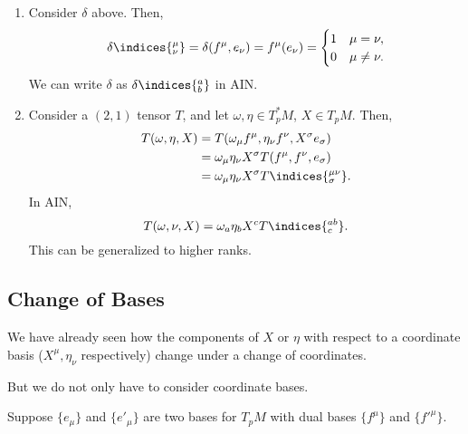 \documentclass[12pt]{article}
\begin{document}
\begin{exbox}
	\begin{enumerate}
		\item Consider $\delta$ above. Then,
			\[
			\delta\indices{^{\mu}_{\nu}} = \delta(f^\mu, e_\nu) = f^\mu(e_\nu) =
			\begin{cases}
				1 & \mu = \nu,\\
				0 & \mu \neq \nu.
			\end{cases}
			\]
			We can write $\delta$ as $\delta\indices{^{a}_{b}}$ in AIN.
		\item Consider a $(2, 1)$ tensor $T$, and let $\omega, \eta \in T_p^\ast M$, $X \in T_p M$. Then,
			\begin{align*}
				T(\omega, \eta, X) &= T(\omega_\mu f^\mu, \eta_\nu f^\nu, X^\sigma e_\sigma) \\
						   &= \omega_\mu \eta_\nu X^\sigma T(f^\mu, f^\nu, e_\sigma) \\
						   &= \omega_\mu \eta_\nu X^\sigma T\indices{^{\mu\nu}_{\sigma}}.
			\end{align*}
			In AIN,
			\[
			T(\omega, \nu, X) = \omega_a \eta_b X^c T\indices{^{ab}_{c}}.
			\]
			This can be generalized to higher ranks.
	\end{enumerate}
	
\end{exbox}


\subsection{Change of Bases}%
\label{sub:cob}

We have already seen how the components of $X$ or $\eta$ with respect to a coordinate basis ($X^\mu, \eta_\nu$ respectively) change under a change of coordinates.

But we do not only have to consider coordinate bases.

Suppose $\{e_\mu\}$ and $\{e'_\mu\}$ are two bases for $T_pM$ with dual bases $\{f^\mu\}$ and $\{f'^\mu\}$.
\end{document}
